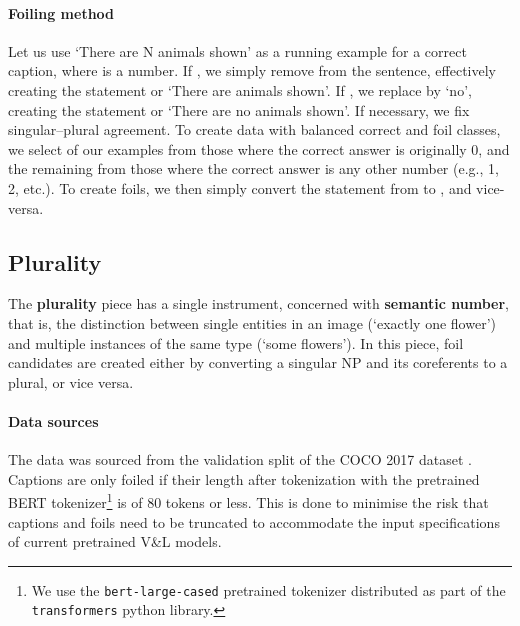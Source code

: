 \documentclass[11pt]{article}
\begin{document}
\paragraph{Foiling method}
Let us use   `There are N animals shown' as a running example for a correct caption, where  is a number.
If , we simply remove  from the sentence, effectively creating the statement  or `There are animals shown'.
If , we replace  by `no', creating the statement  or `There are no animals shown'.
If necessary, we fix singular--plural agreement.
To create data with balanced correct and foil classes, we select  of our examples from those where the correct answer is originally 0, and the remaining  from those where the correct answer is any other number (e.g., 1, 2, etc.).
To create foils, we then simply convert the statement from  to , and vice-versa.


\subsection{Plurality}\label{app:plurality}
The \textbf{plurality} piece has a single instrument, concerned with {\bf semantic number}, that is, the distinction between single entities in an image (`exactly one flower') and multiple instances of the same type (`some flowers'). In this piece, foil candidates are created either by converting a singular NP and its coreferents to a plural, or vice versa. 

\paragraph{Data sources} The data was sourced from the validation split of the COCO 2017 dataset \cite{Chen2015}. Captions are only foiled if their length after tokenization with the pretrained BERT tokenizer\footnote{We use the {\tt bert-large-cased} pretrained tokenizer distributed as part of the {\tt transformers} python library.} is of 80 tokens or less. This is done to minimise the risk that captions and foils need to be truncated to accommodate the input specifications of current pretrained V\&L models.
\end{document}

